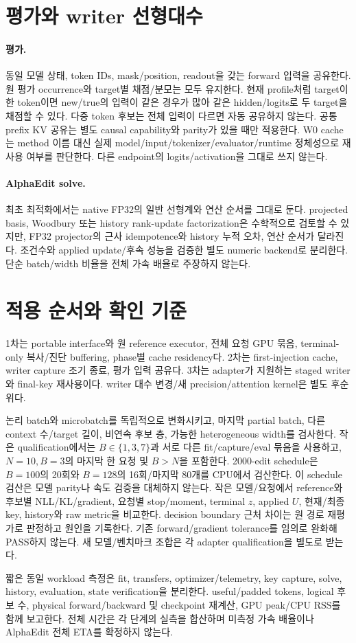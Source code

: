 \documentclass[11pt]{article}
\begin{document}
\section{평가와 writer 선형대수}
\paragraph{평가.}
동일 모델 상태, token IDs, mask/position, readout을 갖는 forward 입력을 공유한다.
원 평가 occurrence와 target별 채점/분모는 모두 유지한다. 현재 profile처럼 target이
한 token이면 new/true의 입력이 같은 경우가 많아 같은 hidden/logits로 두 target을
채점할 수 있다. 다중 token 후보는 전체 입력이 다르면 자동 공유하지 않는다.
공통 prefix KV 공유는 별도 causal capability와 parity가 있을 때만 적용한다.
W0 cache는 method 이름 대신 실제 model/input/tokenizer/evaluator/runtime 정체성으로
재사용 여부를 판단한다. 다른 endpoint의 logits/activation을 그대로 쓰지 않는다.

\paragraph{AlphaEdit solve.}
최초 최적화에서는 native FP32의 일반 선형계와 연산 순서를 그대로 둔다.
projected basis, Woodbury 또는 history rank-update factorization은 수학적으로
검토할 수 있지만, FP32 projector의 근사 idempotence와 history 누적 오차, 연산
순서가 달라진다. 조건수와 applied update/후속 성능을 검증한 별도 numeric backend로
분리한다. 단순 batch/width 비율을 전체 가속 배율로 주장하지 않는다.

\section{적용 순서와 확인 기준}
1차는 portable interface와 원 reference executor, 전체 요청 GPU 묶음, terminal-only
복사/진단 buffering, phase별 cache residency다. 2차는 first-injection cache,
writer capture 조기 종료, 평가 입력 공유다. 3차는 adapter가 지원하는 staged writer와
final-key 재사용이다. writer 대수 변경/새 precision/attention kernel은 별도 후순위다.

논리 batch와 microbatch를 독립적으로 변화시키고, 마지막 partial batch,
다른 context 수/target 길이, 비연속 후보 층, 가능한 heterogeneous width를 검사한다.
작은 qualification에서는 $B\in\{1,3,7\}$과 서로 다른 fit/capture/eval 묶음을
사용하고, $N=10,B=3$의 마지막 한 요청 및 $B>N$을 포함한다.
2000-edit schedule은 $B=100$의 20회와 $B=128$의 16회/마지막 80개를
CPU에서 검산한다. 이 schedule 검산은 모델 parity나 속도 검증을 대체하지 않는다.
작은 모델/요청에서 reference와 후보별 NLL/KL/gradient, 요청별 stop/moment,
terminal $z$, applied $U$, 현재/최종 key, history와 raw metric을 비교한다.
decision boundary 근처 차이는 원 경로 재평가로 판정하고 원인을 기록한다.
기존 forward/gradient tolerance를 임의로 완화해 PASS하지 않는다.
새 모델/벤치마크 조합은 각 adapter qualification을 별도로 받는다.

짧은 동일 workload 측정은 fit, transfers, optimizer/telemetry, key capture,
solve, history, evaluation, state verification을 분리한다. useful/padded tokens,
logical 후보 수, physical forward/backward 및 checkpoint 재계산,
GPU peak/CPU RSS를 함께 보고한다. 전체 시간은 각 단계의 실측을 합산하며
미측정 가속 배율이나 AlphaEdit 전체 ETA를 확정하지 않는다.
\end{document}
